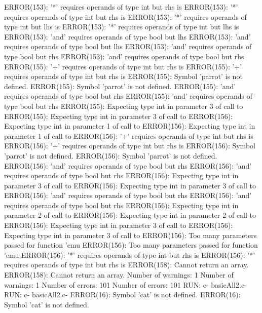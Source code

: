 \documentclass[12pt]{book}
\begin{document}
ERROR(153): '*' requires operands of type int but rhs is        ERROR(153): '*' requires operands of type int but rhs is
ERROR(153): '*' requires operands of type int but lhs is        ERROR(153): '*' requires operands of type int but lhs is
ERROR(153): 'and' requires operands of type bool but lhs        ERROR(153): 'and' requires operands of type bool but lhs
ERROR(153): 'and' requires operands of type bool but rhs        ERROR(153): 'and' requires operands of type bool but rhs
ERROR(155): '+' requires operands of type int but rhs is        ERROR(155): '+' requires operands of type int but rhs is
ERROR(155): Symbol 'parrot' is not defined.                        ERROR(155): Symbol 'parrot' is not defined.
ERROR(155): 'and' requires operands of type bool but rhs        ERROR(155): 'and' requires operands of type bool but rhs
ERROR(155): Expecting type int in parameter 3 of call to        ERROR(155): Expecting type int in parameter 3 of call to
ERROR(156): Expecting type int in parameter 1 of call to        ERROR(156): Expecting type int in parameter 1 of call to
ERROR(156): '+' requires operands of type int but rhs is        ERROR(156): '+' requires operands of type int but rhs is
ERROR(156): Symbol 'parrot' is not defined.                        ERROR(156): Symbol 'parrot' is not defined.
ERROR(156): 'and' requires operands of type bool but rhs        ERROR(156): 'and' requires operands of type bool but rhs
ERROR(156): Expecting type int in parameter 3 of call to        ERROR(156): Expecting type int in parameter 3 of call to
ERROR(156): 'and' requires operands of type bool but rhs        ERROR(156): 'and' requires operands of type bool but rhs
ERROR(156): Expecting type int in parameter 2 of call to        ERROR(156): Expecting type int in parameter 2 of call to
ERROR(156): Expecting type int in parameter 3 of call to        ERROR(156): Expecting type int in parameter 3 of call to
ERROR(156): Too many parameters passed for function 'emu        ERROR(156): Too many parameters passed for function 'emu
ERROR(156): '*' requires operands of type int but rhs is        ERROR(156): '*' requires operands of type int but rhs is
ERROR(158): Cannot return an array.                                ERROR(158): Cannot return an array.
Number of warnings: 1                                                Number of warnings: 1
Number of errors: 101                                                Number of errors: 101
RUN: c- basicAll2.c-                                                RUN: c- basicAll2.c-
ERROR(16): Symbol 'cat' is not defined.                                ERROR(16): Symbol 'cat' is not defined.
\end{document}
